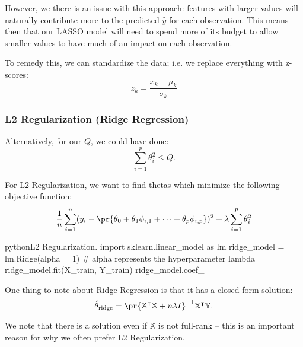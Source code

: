 \documentclass[openany]{book}
\begin{document}
However, we there is an issue with this approach: features with larger values will naturally contribute more to the predicted $\hat y$ for each observation. This means then that our LASSO model will need to spend more of its budget to allow smaller values to have much of an impact on each observation.

To remedy this, we can standardize the data; i.e. we replace everything with z-scores:
\begin{equation*}
	z_k = \dfrac{x_k - \mu_k}{\sigma_k}
\end{equation*}

\subsubsection{L2 Regularization (Ridge Regression)}
Alternatively, for our $Q$, we could have done:
\begin{equation*}
	\sum_{i=1}^{p} \theta_i^{2} \leq Q.
\end{equation*}

\begin{defn}[L2 Regularization]
	For L2 Regularization, we want to find thetas which minimize the following objective function:
	\begin{equation*}
		\dfrac{1}{n} \sum_{i=1}^{n} (y_i - \pr{\theta_0 + \theta_1\phi_{i,1} + \cdots + \theta_p\phi_{i,p}})^{2} + \lambda\sum_{i=1}^{p} \theta_i^{2}
	\end{equation*}
\end{defn}

\begin{code}{python}{L2 Regularization.}
import sklearn.linear_model as lm
ridge_model = lm.Ridge(alpha = 1) # alpha represents the hyperparameter lambda
ridge_model.fit(X_train, Y_train)
ridge_model.coef_

\end{code}

One thing to note about Ridge Regression is that it has a closed-form solution:
\begin{equation*}
	\hat{\theta}_\mathrm{ridge} = \pr{\mathbb X^{\intercal} \mathbb X + n \lambda I}^{-1} \mathbb X^{\intercal} \mathbb Y. 
\end{equation*}

\begin{warn}
	We note that there is a solution even if $\mathbb X$ is not full-rank -- this is an important reason for why we often prefer L2 Regularization.
\end{warn}
\end{document}
